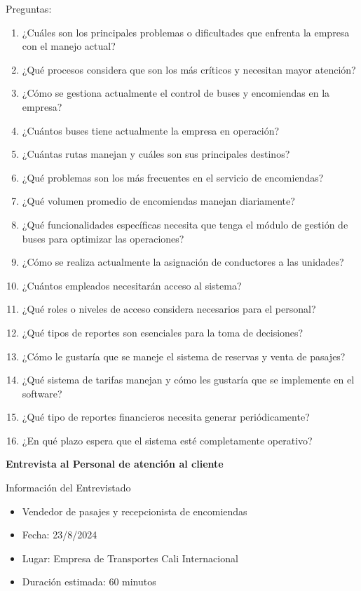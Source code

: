 	Preguntas:
	
	\begin{enumerate}[left=0.1cm, labelsep = 0.9cm, topsep = 0pt, parsep = 0pt]
		\item ¿Cuáles son los principales problemas o dificultades que enfrenta la empresa con el manejo actual?
		\item ¿Qué procesos considera que son los más críticos y necesitan mayor atención?
		\item ¿Cómo se gestiona actualmente el control de buses y encomiendas en la empresa?
		\item ¿Cuántos buses tiene actualmente la empresa en operación?
		\item ¿Cuántas rutas manejan y cuáles son sus principales destinos?
		\item ¿Qué problemas son los más frecuentes en el servicio de encomiendas?
		\item ¿Qué volumen promedio de encomiendas manejan diariamente?
		\item ¿Qué funcionalidades específicas necesita que tenga el módulo de gestión de buses para optimizar las operaciones?
		\item ¿Cómo se realiza actualmente la asignación de conductores a las unidades?
		\item ¿Cuántos empleados necesitarán acceso al sistema?
		\item ¿Qué roles o niveles de acceso considera necesarios para el personal?
		\item ¿Qué tipos de reportes son esenciales para la toma de decisiones?
		\item ¿Cómo le gustaría que se maneje el sistema de reservas y venta de pasajes?
		\item ¿Qué sistema de tarifas manejan y cómo les gustaría que se implemente en el software?
		\item ¿Qué tipo de reportes financieros necesita generar periódicamente?
		\item ¿En qué plazo espera que el sistema esté completamente operativo?
	\end{enumerate}
	
	\textbf{Entrevista al Personal de atención al cliente}
		
	Información del Entrevistado
	\begin{itemize}[label=$-$, left=0cm, labelsep = 0.9cm, topsep = 0pt, parsep = 0pt]
		\item Vendedor de pasajes y recepcionista de encomiendas
		\item Fecha: 23/8/2024
		\item Lugar: Empresa de Transportes Cali Internacional
		\item Duración estimada: 60 minutos
	\end{itemize}
	
